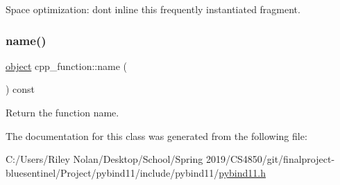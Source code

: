 Space optimization\+: don\textquotesingle{}t inline this frequently instantiated fragment. 

\mbox{\label{classcpp__function_a5d8bcdd6781aa6da434299589c68013e}} 
\subsubsection{\texorpdfstring{name()}{name()}}
{\footnotesize\ttfamily \mbox{\hyperlink{classobject}{object}} cpp\+\_\+function\+::name (\begin{DoxyParamCaption}{ }\end{DoxyParamCaption}) const\hspace{0.3cm}{\ttfamily [inline]}}



Return the function name. 



The documentation for this class was generated from the following file\+:\begin{DoxyCompactItemize}
\item 
C\+:/\+Users/\+Riley Nolan/\+Desktop/\+School/\+Spring 2019/\+C\+S4850/git/finalproject-\/bluesentinel/\+Project/pybind11/include/pybind11/\mbox{\hyperlink{pybind11_8h}{pybind11.\+h}}\end{DoxyCompactItemize}
